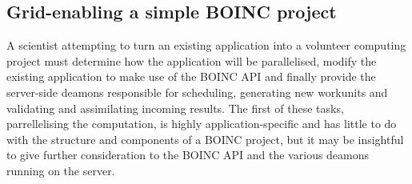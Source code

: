 \subsection{Grid-enabling a simple BOINC project} \label{Bgridenable}
A scientist attempting to turn an existing application into a volunteer computing project must  determine how the application will be parallelised, modify the existing application to make use of the BOINC API and finally provide the server-side deamons responsible for scheduling,  generating new workunits and validating and assimilating incoming results.
The first of these tasks, parrellelising the computation, is highly application-specific and has little to do with the structure and components of a BOINC project, but it may be insightful to give further consideration to the BOINC API and the various deamons running on the server.
